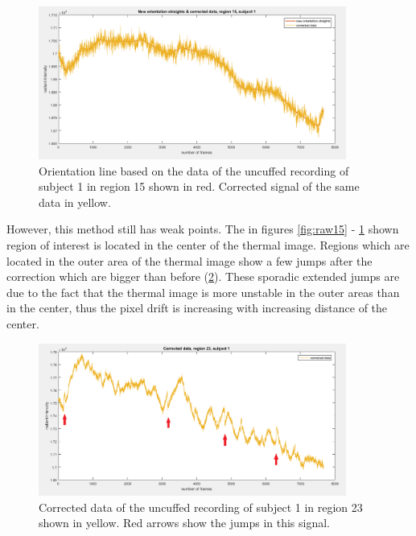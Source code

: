 \begin{figure}[H]
	\includegraphics[width=0.9\textwidth]{figures/corr15}
	\caption{Orientation line based on the data of the uncuffed recording of subject 1 in region 15 shown in red. Corrected signal of the same data in yellow.}
	\label{fig:corr15}
\end{figure}
However, this method still has weak points. The in figures \ref{fig:raw15} - \ref{fig:corr15} shown region of interest is located in the center of the thermal image. Regions which are located in the outer area of the thermal image show a few jumps after the correction which are bigger than before (\ref{fig:corr23}). These sporadic extended jumps are due to the fact that the thermal image is more unstable in the outer areas than in the center, thus the pixel drift is increasing with increasing distance of the center.
\begin{figure}[H]
	\includegraphics[width=0.9\textwidth]{figures/corr23pfeile}
	\caption{Corrected data of the uncuffed recording of subject 1 in region 23 shown in yellow. Red arrows show the jumps in this signal.}
	\label{fig:corr23}
\end{figure}